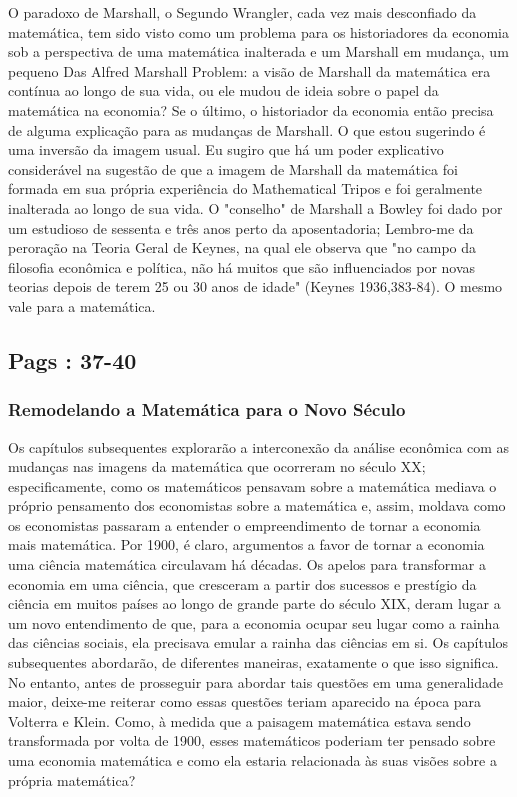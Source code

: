 \documentclass[12pt]{article}
\begin{document}
O paradoxo de Marshall, o Segundo Wrangler, cada vez mais desconfiado da matemática, tem sido visto como um problema para os historiadores da economia sob a perspectiva de uma matemática inalterada e um Marshall em mudança, um pequeno Das Alfred Marshall Problem: a visão de Marshall da matemática era contínua ao longo de sua vida, ou ele mudou de ideia sobre o papel da matemática na economia? Se o último, o historiador da economia então precisa de alguma explicação para as mudanças de Marshall. O que estou sugerindo é uma inversão da imagem usual. Eu sugiro que há um poder explicativo considerável na sugestão de que a imagem de Marshall da matemática foi formada em sua própria experiência do Mathematical Tripos e foi geralmente inalterada ao longo de sua vida. O "conselho" de Marshall a Bowley foi dado por um estudioso de sessenta e três anos perto da aposentadoria; Lembro-me da peroração na Teoria Geral de Keynes, na qual ele observa que "no campo da filosofia econômica e política, não há muitos que são influenciados por novas teorias depois de terem 25 ou 30 anos de idade" (Keynes 1936,383-84). O mesmo vale para a matemática.

\subsection{\textbf{Pags : 37-40}}
\subsubsection{\textbf{Remodelando a Matemática para o Novo Século}}
Os capítulos subsequentes explorarão a interconexão da análise econômica com as mudanças nas imagens da matemática que ocorreram no século XX; especificamente, como os matemáticos pensavam sobre a matemática mediava o próprio pensamento dos economistas sobre a matemática e, assim, moldava como os economistas passaram a entender o empreendimento de tornar a economia mais matemática. Por 1900, é claro, argumentos a favor de tornar a economia uma ciência matemática circulavam há décadas. Os apelos para transformar a economia em uma ciência, que cresceram a partir dos sucessos e prestígio da ciência em muitos países ao longo de grande parte do século XIX, deram lugar a um novo entendimento de que, para a economia ocupar seu lugar como a rainha das ciências sociais, ela precisava emular a rainha das ciências em si. Os capítulos subsequentes abordarão, de diferentes maneiras, exatamente o que isso significa. No entanto, antes de prosseguir para abordar tais questões em uma generalidade maior, deixe-me reiterar como essas questões teriam aparecido na época para Volterra e Klein. Como, à medida que a paisagem matemática estava sendo transformada por volta de 1900, esses matemáticos poderiam ter pensado sobre uma economia matemática e como ela estaria relacionada às suas visões sobre a própria matemática?
\end{document}
